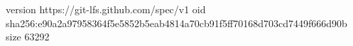 version https://git-lfs.github.com/spec/v1
oid sha256:e90a2a97958364f5e5852b5eab4814a70cb91f5ff70168d703cd7449f666d90b
size 63292
